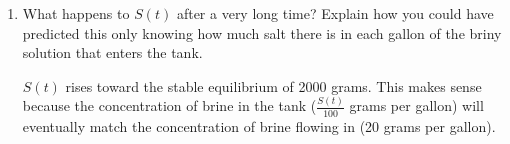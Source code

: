 \begin{enumerate}[leftmargin=0pt]
\begin{enumerate}
    \begin{red}
        Let's begin by separating and solving. I'm choosing to leave the $\frac{1}{100}$ on the right.
        \begin{align*}
            \dfrac{dS}{dt} &= \dfrac{1}{100}\left(6000 - 3S\right) \\
            \int \dfrac{1}{6000-3S} \ dS &= \int \dfrac{1}{100}\ dt \\
            -\dfrac{1}{3}\ln(6000 - 3S) &= \dfrac{1}{100}t + C \\
            \ln(6000 - 3S) &= -\dfrac{3}{100}t + C \\
            6000 - 3S &= C\cdot \exp\left(-\tfrac{3}{100}t\right) \\
            S(t) &= 2000 - C\cdot \exp\left(-\tfrac{3}{100}t\right) \\
            0 = S(0) &= 2000 - C\cdot \exp\left(-\tfrac{3}{100}\cdot 0\right) \\
            C &= 2000 \\
            S(t) &= 2000 - 2000\cdot \exp\left(-\tfrac{3}{100}t\right)
        \end{align*}
    \end{red}
    \item What happens to $S(t)$ after a very long time? Explain how you could have predicted this only knowing how much salt there is in each gallon of the briny solution that enters the tank.

    \begin{red}
        $S(t)$ rises toward the stable equilibrium of 2000 grams. This makes sense because the concentration of brine in the tank ($\tfrac{S(t)}{100}$ grams per gallon) will eventually match the concentration of brine flowing in (20 grams per gallon).
    \end{red}
\end{enumerate}

\end{enumerate}

